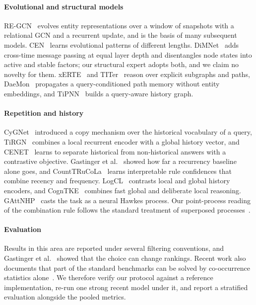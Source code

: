 \documentclass[conference]{IEEEtran}
\begin{document}
\paragraph{Evolutional and structural models}
RE-GCN~\cite{regcn} evolves entity representations over a window of snapshots
with a relational GCN and a recurrent update, and is the basis of many
subsequent models. CEN~\cite{cen} learns evolutional patterns of different
lengths. DiMNet~\cite{dimnet} adds cross-time message passing at equal layer
depth and disentangles node states into active and stable factors; our
structural expert adopts both, and we claim no novelty for them. xERTE~\cite{xerte}
and TITer~\cite{titer} reason over explicit subgraphs and paths, DaeMon~\cite{daemon}
propagates a query-conditioned path memory without entity embeddings, and
TiPNN~\cite{tipnn} builds a query-aware history graph.

\paragraph{Repetition and history}
CyGNet~\cite{cygnet} introduced a copy mechanism over the historical
vocabulary of a query, TiRGN~\cite{tirgn} combines a local recurrent encoder
with a global history vector, and CENET~\cite{cenet} learns to separate
historical from non-historical answers with a contrastive objective. Gastinger
et al.~\cite{historyrepeats} showed how far a recurrency baseline alone goes, and
CountTRuCoLa~\cite{counttrucola} learns interpretable rule confidences that
combine recency and frequency. LogCL~\cite{logcl} contrasts local and global
history encoders, and CognTKE~\cite{cogntke} combines fast global and deliberate
local reasoning. GAttNHP~\cite{gattnhp} casts the task as a neural Hawkes
process. Our point-process reading of the combination rule follows the
standard treatment of superposed processes~\cite{daleyvere}.

\paragraph{Evaluation}
Results in this area are reported under several filtering conventions, and
Gastinger et al.~\cite{gastingereval} showed that the choice can change
rankings. Recent work also documents that part of the standard benchmarks can
be solved by co-occurrence statistics alone~\cite{shortcut}. We therefore
verify our protocol against a reference implementation, re-run one strong
recent model under it, and report a stratified evaluation alongside the
pooled metrics.
\end{document}
